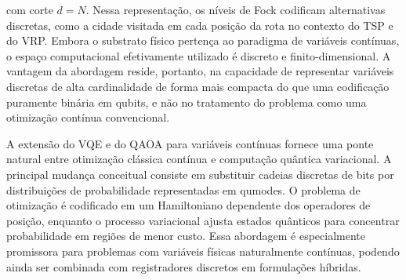 \noindent com corte $d=N$. Nessa representação, os níveis de Fock codificam alternativas discretas, como a cidade visitada em cada posição da rota no contexto do TSP e do VRP. Embora o substrato físico pertença ao paradigma de variáveis contínuas, o espaço computacional efetivamente utilizado é discreto e finito-dimensional. A vantagem da abordagem reside, portanto, na capacidade de representar variáveis discretas de alta cardinalidade de forma mais compacta do que uma codificação puramente binária em qubits, e não no tratamento do problema como uma otimização contínua convencional.

A extensão do VQE e do QAOA para variáveis contínuas fornece uma ponte natural entre otimização clássica contínua e computação quântica variacional. A principal mudança conceitual consiste em substituir cadeias discretas de bits por distribuições de probabilidade representadas em qumodes. O problema de otimização é codificado em um Hamiltoniano dependente dos operadores de posição, enquanto o processo variacional ajusta estados quânticos para concentrar probabilidade em regiões de menor custo. Essa abordagem é especialmente promissora para problemas com variáveis físicas naturalmente contínuas, podendo ainda ser combinada com registradores discretos em formulações híbridas.
